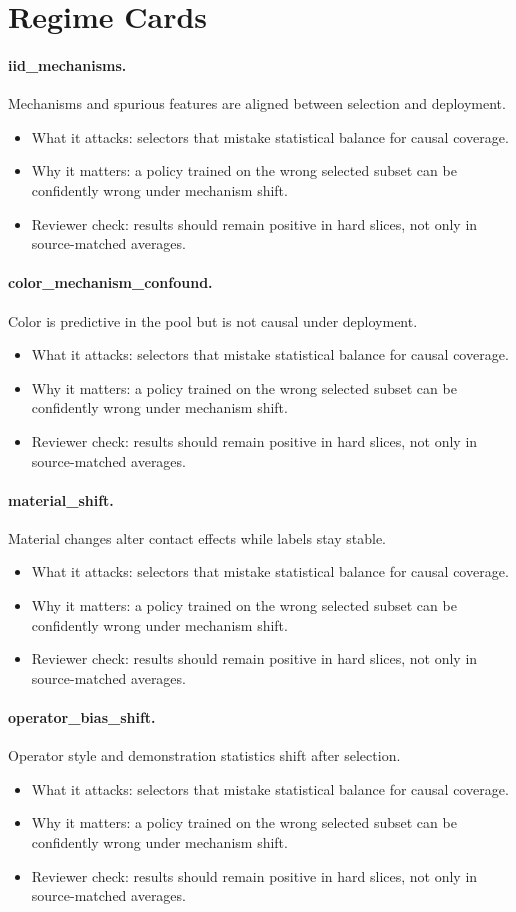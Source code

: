 \documentclass{article}
\begin{document}
\section{Regime Cards}
\paragraph{iid\_mechanisms.} Mechanisms and spurious features are aligned between selection and deployment.
\begin{itemize}
\item What it attacks: selectors that mistake statistical balance for causal coverage.
\item Why it matters: a policy trained on the wrong selected subset can be confidently wrong under mechanism shift.
\item Reviewer check: results should remain positive in hard slices, not only in source-matched averages.
\end{itemize}
\paragraph{color\_mechanism\_confound.} Color is predictive in the pool but is not causal under deployment.
\begin{itemize}
\item What it attacks: selectors that mistake statistical balance for causal coverage.
\item Why it matters: a policy trained on the wrong selected subset can be confidently wrong under mechanism shift.
\item Reviewer check: results should remain positive in hard slices, not only in source-matched averages.
\end{itemize}
\paragraph{material\_shift.} Material changes alter contact effects while labels stay stable.
\begin{itemize}
\item What it attacks: selectors that mistake statistical balance for causal coverage.
\item Why it matters: a policy trained on the wrong selected subset can be confidently wrong under mechanism shift.
\item Reviewer check: results should remain positive in hard slices, not only in source-matched averages.
\end{itemize}
\paragraph{operator\_bias\_shift.} Operator style and demonstration statistics shift after selection.
\begin{itemize}
\item What it attacks: selectors that mistake statistical balance for causal coverage.
\item Why it matters: a policy trained on the wrong selected subset can be confidently wrong under mechanism shift.
\item Reviewer check: results should remain positive in hard slices, not only in source-matched averages.
\end{itemize}
\end{document}
